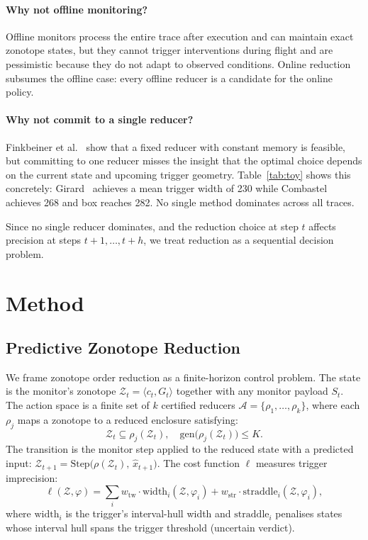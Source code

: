 \documentclass{article}
\newcommand{\Z}{\mathcal{Z}}
\begin{document}
\paragraph{Why not offline monitoring?}
Offline monitors process the entire trace after execution and can maintain exact zonotope states, but they cannot trigger interventions during flight and are pessimistic because they do not adapt to observed conditions.
Online reduction subsumes the offline case: every offline reducer is a candidate for the online policy.

\paragraph{Why not commit to a single reducer?}
Finkbeiner et al.~\cite{Finkbeiner2025} show that a fixed reducer with constant memory is feasible, but committing to one reducer misses the insight that the optimal choice depends on the current state and upcoming trigger geometry.
Table~\ref{tab:toy} shows this concretely: Girard~\cite{Girard2005} achieves a mean trigger width of 230 while Combastel~\cite{Combastel2003} achieves 268 and box reaches 282.
No single method dominates across all traces.

Since no single reducer dominates, and the reduction choice at step $t$ affects precision at steps $t+1, \ldots, t+h$, we treat reduction as a sequential decision problem.


\section{Method}\label{sec:method}

\subsection{Predictive Zonotope Reduction}\label{sec:method-pzr}

We frame zonotope order reduction as a finite-horizon control problem.
The state is the monitor's zonotope $\Z_t = \langle c_t, G_t \rangle$ together with any monitor payload $S_t$.
The action space is a finite set of $k$ certified reducers $\mathcal{A} = \{\rho_1, \ldots, \rho_k\}$, where each $\rho_j$ maps a zonotope to a reduced enclosure satisfying:
\begin{equation}\label{eq:cert}
\Z_t \subseteq \rho_j(\Z_t), \quad \mathrm{gen}\bigl(\rho_j(\Z_t)\bigr) \leq K.
\end{equation}
The transition is the monitor step applied to the reduced state with a predicted input: $\Z_{t+1} = \mathrm{Step}\bigl(\rho(\Z_t),\, \hat{x}_{t+1}\bigr)$.
The cost function $\ell$ measures trigger imprecision:
\begin{equation}\label{eq:cost}
\ell(\Z, \varphi) = \sum_i w_{\mathrm{tw}} \cdot \mathrm{width}_i(\Z, \varphi_i) + w_{\mathrm{str}} \cdot \mathrm{straddle}_i(\Z, \varphi_i),
\end{equation}
where $\mathrm{width}_i$ is the trigger's interval-hull width and $\mathrm{straddle}_i$ penalises states whose interval hull spans the trigger threshold (uncertain verdict).
\end{document}
